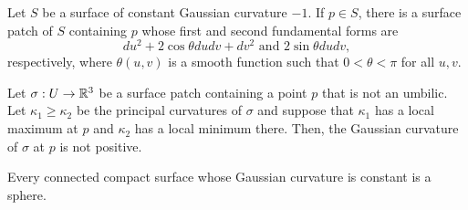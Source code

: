 \begin{proposition}
  Let $S$ be a surface of constant Gaussian curvature $-1$.
  If $p \in S$, there is a surface patch of $S$ containing $p$ whose
  first and second fundamental forms are
  \[
    du^2 + 2 \cos \theta du dv + dv^2 \text{ and } 2 \sin \theta du dv,  
  \]
  respectively, where $\theta(u, v)$ is a smooth function such that
  $0 < \theta < \pi$ for all $u, v$.
\end{proposition}

\begin{lemma}
  Let $\sigma: U \to \mathbb{R}^3$ be a surface patch containing a point $p$ that is not an umbilic.
  Let $\kappa_1 \geq \kappa_2$ be the principal curvatures of $\sigma$ and suppose that $\kappa_1$
  has a local maximum at $p$ and $\kappa_2$ has a local minimum there.
  Then, the Gaussian curvature of $\sigma$ at $p$ is not positive.
\end{lemma}

\begin{theorem}
  Every connected compact surface whose Gaussian curvature is constant is a sphere.
\end{theorem}
